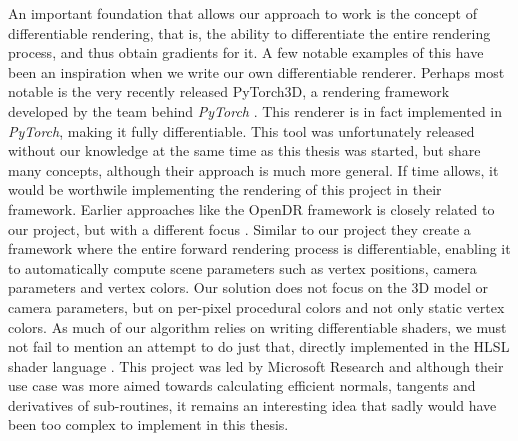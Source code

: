 An important foundation that allows our approach to work is the concept of differentiable rendering, that is, the ability to differentiate the entire rendering process, and thus obtain gradients for it. A few notable examples of this have been an inspiration when we write our own differentiable renderer. Perhaps most notable is the very recently released PyTorch3D, a rendering framework developed by the team behind \textit{PyTorch} \cite{facebookresearch_2020_facebookresearchpytorch3d, paszke_2019_pytorch}. This renderer is in fact implemented in \textit{PyTorch}, making it fully differentiable. This tool was unfortunately released without our knowledge at the same time as this thesis was started, but share many concepts, although their approach is much more general. If time allows, it would be worthwile implementing the rendering of this project in their framework. Earlier approaches like the OpenDR framework is closely related to our project, but with a different focus \cite{loper_2014_opendr}. Similar to our project they create a framework where the entire forward rendering process is differentiable, enabling it to automatically compute scene parameters such as vertex positions, camera parameters and vertex colors. Our solution does not focus on the 3D model or camera parameters, but on per-pixel procedural colors and not only static vertex colors. As much of our algorithm relies on writing differentiable shaders, we must not fail to mention an attempt to do just that, directly implemented in the HLSL shader language \cite{guenter_2011_symbolic}. This project was led by Microsoft Research and although their use case was more aimed towards calculating efficient normals, tangents and derivatives of sub-routines, it remains an interesting idea that sadly would have been too complex to implement in this thesis.